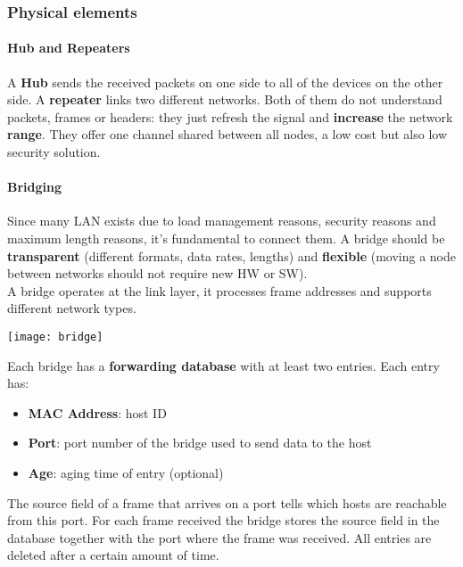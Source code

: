 \newpage
\subsubsection{Physical elements}
\paragraph{Hub and Repeaters} A \textbf{Hub} sends the received packets on one side to all of the devices on the other side. A \textbf{repeater} links two different networks. Both of them do not understand packets, frames or headers: they just refresh the signal and \textbf{increase} the network \textbf{range}. They offer one channel shared between all nodes, a low cost but also low security solution.
\begin{figure}[!h]
	\hfil
	\hfil
\end{figure}

\paragraph{Bridging} Since many LAN exists due to load management reasons, security reasons and maximum length reasons, it's fundamental to connect them. A bridge should be \textbf{transparent} (different formats, data rates, lengths) and \textbf{flexible} (moving a node between networks should not require new HW or SW).\\
A bridge operates at the link layer, it processes frame addresses and supports different network types.

\begin{center}
	\texttt{[image: bridge]}
\end{center}

\noindent Each bridge has a \textbf{forwarding database} with at least two entries. Each entry has:
\begin{itemize}
	\item \textbf{MAC Address}: host ID
	\item \textbf{Port}: port number of the bridge used to send data to the host
	\item \textbf{Age}: aging time of entry (optional)
\end{itemize}
The source field of a frame that arrives on a port tells which hosts are reachable from this port. For each frame received the bridge stores the source field in the database together with the port where the frame was received. All entries are deleted after a certain amount of time.

